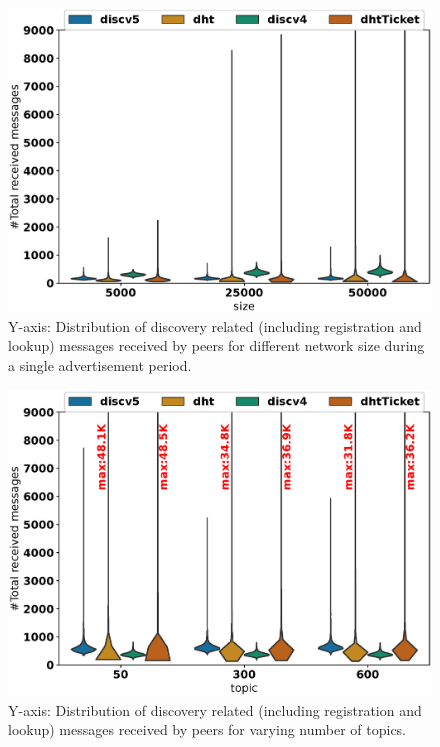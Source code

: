 \begin{figure}[!h]
\centering
\includegraphics[width=\linewidth]{results/efficiency/violin_size_totalMsg.eps}
\caption{Y-axis: Distribution of discovery related (including registration and lookup) messages received by peers for different network size during a single advertisement period.}
\label{fig:msgsPerSize}
\end{figure}

\begin{figure}
\centering
\includegraphics[width=\linewidth]{results/efficiency/violin_topic_totalMsg.eps}
\caption{Y-axis: Distribution of discovery related (including registration and lookup) messages received by peers for varying number of topics.}
\label{fig:msgsPerTopic}
\end{figure}

